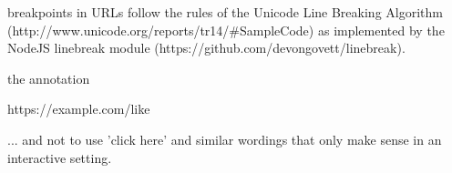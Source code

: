 \mktsRuleSwell{}\vspace{\parskip}%
\begin{multicols}{2}\raggedcolumns{}



\begin{mktsEnNotes}{\mktsEnStyleMarkNotes{}\mktsEnMarkAfter{}}breakpoints in URLs follow the rules of the Unicode
Line Breaking Algorithm  ({\mktsStyleUrl{}http:\g/\g/\allowbreak{}www.unicode.org\g/\allowbreak{}reports\g/\allowbreak{}tr14\g/\allowbreak{}\#SampleCode\allowbreak{}}) as implemented by the
NodeJS {\mktsStyleCode{}linebreak} module ({\mktsStyleUrl{}https:\g/\g/\allowbreak{}github.com\g/\allowbreak{}devongovett\g/\allowbreak{}linebreak\allowbreak{}}).

{\mktsEnStyleMarkNotes{}\mktsEnMarkAfter{}}the annotation

{\mktsEnStyleMarkNotes{}\mktsEnMarkAfter{}}{\mktsStyleUrl{}https:\g/\g/\allowbreak{}example.com\g/\allowbreak{}like\allowbreak{}}

{\mktsEnStyleMarkNotes{}\mktsEnMarkAfter{}}... and not
to use 'click here' and similar wordings that only make sense in an interactive setting.

\end{mktsEnNotes}




\end{multicols}

